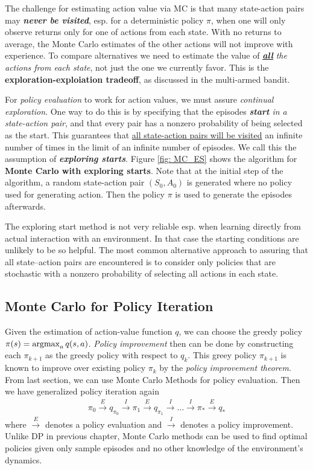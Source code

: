 \documentclass[11pt]{article}
\begin{document}
The challenge for estimating action value via MC is that many state-action pairs may \emph{\textbf{never be visited}}, esp. for a deterministic policy $\pi$, when one will only observe returns only for one of actions from each state.  With no returns to average, the Monte Carlo estimates of the other actions will not improve with experience. To compare alternatives we need to estimate the value of \emph{\textbf{\underline{all}}} \emph{the actions from each state}, not just the one we currently favor. This is the \textbf{exploration-exploiation tradeoff}, as discussed in the multi-armed bandit. 

For \emph{policy evaluation} to work for action values, we must assure \emph{continual exploration}. One way to do this is by specifying that the episodes \emph{\textbf{start} in a state-action pair}, and that every pair has a nonzero probability of being selected as the start. This guarantees that \underline{all state-action pairs will be visited} an infinite number of times in the limit of an infinite number of episodes. We call this the assumption of \emph{\textbf{exploring starts}}. Figure \ref{fig: MC_ES} shows the algorithm for \textbf{Monte Carlo with exploring starts}. Note that at the initial step of the algorithm, a random state-action pair $(S_{0}, A_{0})$ is generated where no policy used for generating action. Then the policy $\pi$ is used to generate the episodes afterwards. 

The exploring start method is not very reliable esp. when learning directly from actual interaction with an environment. In that case the starting conditions are unlikely to be so helpful. The most common alternative approach to assuring that all state–action pairs are encountered is to consider only policies that are stochastic with a nonzero probability of selecting all actions in each state.


\subsection{Monte Carlo for Policy Iteration}
Given the estimation of action-value function $q$, we can choose the greedy policy $\pi(s) = \operatorname{argmax}_{a}q(s, a)$. \emph{Policy improvement} then can be done by constructing each $\pi_{k+1}$ as the greedy policy with respect to $q_k$. This greey policy $\pi_{k+1}$ is known to improve over existing policy $\pi_{k}$ by the \emph{policy improvement theorem}. From last section, we can use Monte Carlo Methods for policy evaluation. Then we have generalized policy iteration again
\begin{align*}
\pi_{0} \xrightarrow{E} q_{\pi_0} \xrightarrow{I} \pi_{1} \xrightarrow{E} q_{\pi_1}  \xrightarrow{I} \ldots \xrightarrow{I} \pi_{*} \xrightarrow{E} q_{*}
\end{align*} where $ \xrightarrow{E}$ denotes a policy evaluation and $\xrightarrow{I}$ denotes a policy improvement. Unlike DP in previous chapter, Monte Carlo methods can be used to find optimal policies given only sample episodes and no other knowledge of the environment’s dynamics. 
\end{document}
